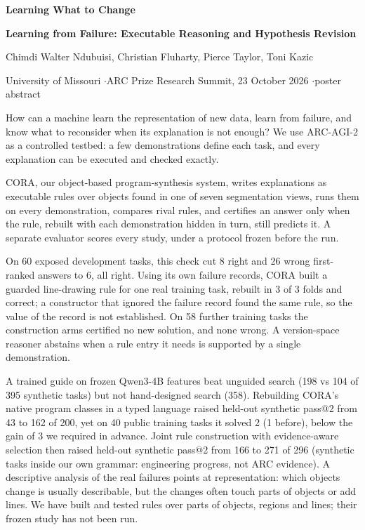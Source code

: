 \documentclass[11pt]{article}
\begin{document}
{\Large\bfseries Learning What to Change\par}
\vspace{0.2em}
{\large\bfseries Learning from Failure: Executable Reasoning and Hypothesis Revision\par}
\vspace{0.6em}
{\large Chimdi Walter Ndubuisi, Christian Fluharty, Pierce Taylor, Toni Kazic\par}
{\color{ink2} University of Missouri \quad$\cdot$\quad ARC Prize Research Summit, 23 October 2026 \quad$\cdot$\quad poster abstract\par}
\vspace{1.0em}

How can a machine learn the representation of new data, learn from failure, and know what to reconsider when its
explanation is not enough? We use ARC-AGI-2 as a controlled testbed: a few demonstrations define each task, and every
explanation can be executed and checked exactly.

CORA, our object-based program-synthesis system, writes explanations as executable rules over objects found in one
of seven segmentation views, runs them on every demonstration, compares rival rules, and certifies an answer only
when the rule, rebuilt with each demonstration hidden in turn, still predicts it. A separate evaluator scores every
study, under a protocol frozen before the run.

On 60 exposed development tasks, this check cut 8 right and 26 wrong first-ranked answers to 6, all right. Using its
own failure records, CORA built a guarded line-drawing rule for one real training task, rebuilt in 3 of 3 folds and
correct; a constructor that ignored the failure record found the same rule, so the value of the record is not
established. On 58 further training tasks the construction arms certified no new solution, and none wrong. A
version-space reasoner abstains when a rule entry it needs is supported by a single demonstration.

A trained guide on frozen Qwen3-4B features beat unguided search (198 vs 104 of 395 synthetic tasks) but not
hand-designed search (358). Rebuilding CORA's native program classes in a typed language raised held-out synthetic
pass@2 from 43 to 162 of 200, yet on 40 public training tasks it solved 2 (1 before), below the gain of 3 we required
in advance. Joint rule construction with evidence-aware selection then raised held-out synthetic pass@2 from 166 to
271 of 296 (synthetic tasks inside our own grammar: engineering progress, not ARC evidence). A descriptive analysis of
the real failures points at representation: which objects change is usually describable, but the changes often touch
parts of objects or add lines. We have built and tested rules over parts of objects, regions and lines; their frozen
study has not been run.
\end{document}
